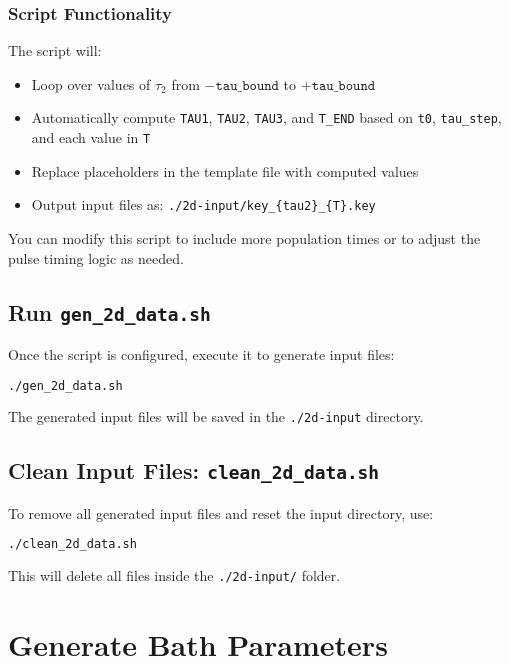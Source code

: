 \documentclass{article}
\begin{document}
\subsubsection*{Script Functionality}

The script will:

\begin{itemize}
    \item Loop over values of \(\tau_2\) from \(-\texttt{tau\_bound}\) to \(+\texttt{tau\_bound}\)
    \item Automatically compute \texttt{TAU1}, \texttt{TAU2}, \texttt{TAU3}, and \texttt{T\_END} based on \texttt{t0}, \texttt{tau\_step}, and each value in \texttt{T}
    \item Replace placeholders in the template file with computed values
    \item Output input files as: \texttt{./2d-input/key\_\{tau2\}\_\{T\}.key}
\end{itemize}

You can modify this script to include more population times or to adjust the pulse timing logic as needed.

\subsection*{Run \texttt{gen\_2d\_data.sh}}

Once the script is configured, execute it to generate input files:

\begin{lstlisting}[language=bash]
./gen_2d_data.sh
\end{lstlisting}

The generated input files will be saved in the \texttt{./2d-input} directory.

\subsection*{Clean Input Files: \texttt{clean\_2d\_data.sh}}

To remove all generated input files and reset the input directory, use:

\begin{lstlisting}[language=bash]
./clean_2d_data.sh
\end{lstlisting}

This will delete all files inside the \texttt{./2d-input/} folder.

\newpage

\section{Generate Bath Parameters}
\end{document}
